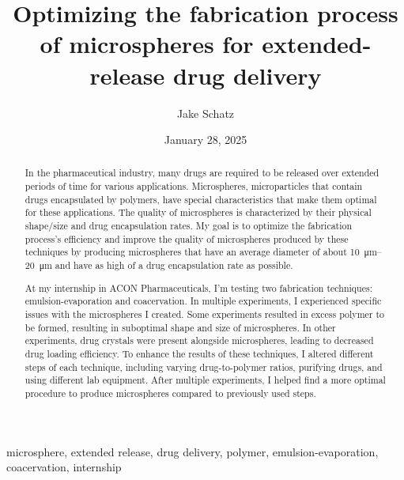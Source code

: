 ﻿\documentclass[12pt,conference,onecolumn]{IEEEtran}
\title{Optimizing the fabrication process of microspheres for extended-release drug delivery}
\author{Jake Schatz}
\date{January 28, 2025}
\begin{document}
\maketitle 

\begin{abstract}
In the pharmaceutical industry, many drugs are required to be released over extended periods of time for various applications. Microspheres, microparticles that contain drugs encapsulated by polymers, have special characteristics that make them optimal for these applications. The quality of microspheres is characterized by their physical shape/size and drug encapsulation rates. My goal is to optimize the fabrication process's efficiency and improve the quality of microspheres produced by these techniques by producing microspheres that have an average diameter of about \qtyrange{10}{20}{\micro\meter} and have as high of a drug encapsulation rate as possible.

At my internship in ACON Pharmaceuticals, I’m testing two fabrication techniques: emulsion-evaporation and coacervation. In multiple experiments, I experienced specific issues with the microspheres I created. Some experiments resulted in excess polymer to be formed, resulting in suboptimal shape and size of microspheres. In other experiments, drug crystals were present alongside microspheres, leading to decreased drug loading efficiency. To enhance the results of these techniques, I altered different steps of each technique, including varying drug-to-polymer ratios, purifying drugs, and using different lab equipment. After multiple experiments, I helped find a more optimal procedure to produce microspheres compared to previously used steps.
\end{abstract}

\begin{IEEEkeywords}
microsphere, extended release, drug delivery, polymer, emulsion-evaporation, coacervation, internship
\end{IEEEkeywords}
\end{document}
